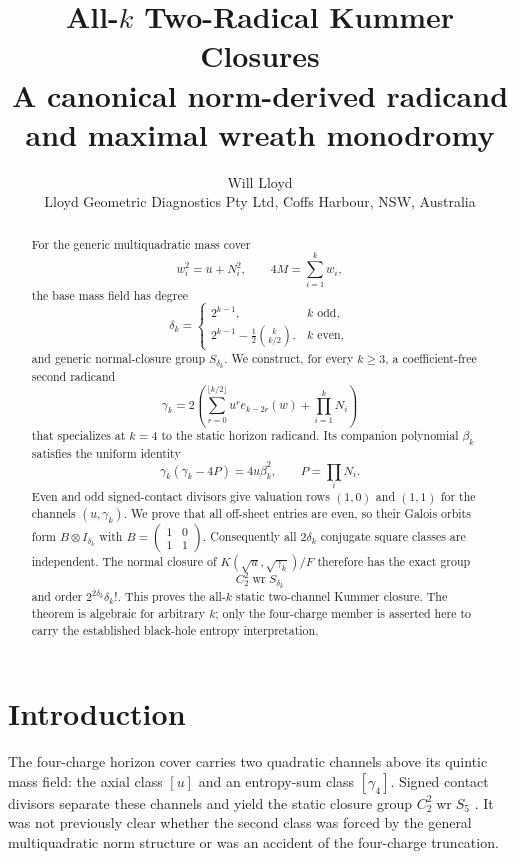 \documentclass[11pt,a4paper]{article}
\title{\textbf{All-$k$ Two-Radical Kummer Closures}\\[4pt]
\large A canonical norm-derived radicand and maximal wreath monodromy\\[6pt]
\normalsize\fbox{Completed proof --- v1.0 --- 18 July 2026}}
\author{Will Lloyd\\
\small Lloyd Geometric Diagnostics Pty Ltd, Coffs Harbour, NSW, Australia}
\date{}
\theoremstyle{definition}
\theoremstyle{remark}
\newcommand{\wrp}{\mathop{\mathrm{wr}}}
\begin{document}
\maketitle

\begin{abstract}
For the generic multiquadratic mass cover
\[
  w_i^2=u+N_i^2,\qquad 4M=\sum_{i=1}^k w_i,
\]
the base mass field has degree
\[
\delta_k=
\begin{cases}
2^{k-1},&k\text{ odd},\\
2^{k-1}-\frac12\binom{k}{k/2},&k\text{ even},
\end{cases}
\]
and generic normal-closure group $S_{\delta_k}$.  We construct, for every
$k\geq3$, a coefficient-free second radicand
\[
 \gamma_k=2\left(
 \sum_{r=0}^{\lfloor k/2\rfloor}u^r e_{k-2r}(w)
 +\prod_{i=1}^kN_i\right)
\]
that specializes at $k=4$ to the static horizon radicand.  Its companion
polynomial $\beta_k$ satisfies the uniform identity
\[
 \gamma_k(\gamma_k-4P)=4u\beta_k^2,
 \qquad P=\prod_iN_i.
\]
Even and odd signed-contact divisors give valuation rows $(1,0)$ and
$(1,1)$ for the channels $(u,\gamma_k)$.  We prove that all off-sheet
entries are even, so their Galois orbits form
$B\otimes I_{\delta_k}$ with
$B=\left(\begin{smallmatrix}1&0\\1&1\end{smallmatrix}\right)$.
Consequently all $2\delta_k$ conjugate square classes are independent.
The normal closure of
$K(\sqrt u,\sqrt{\gamma_k})/F$ therefore has the exact group
\[
 C_2^2\wrp S_{\delta_k}
\]
and order $2^{2\delta_k}\delta_k!$.  This proves the all-$k$ static
two-channel Kummer closure.  The theorem is algebraic for arbitrary $k$;
only the four-charge member is asserted here to carry the established
black-hole entropy interpretation.
\end{abstract}

\section{Introduction}

The four-charge horizon cover carries two quadratic channels above its
quintic mass field: the axial class $[u]$ and an entropy-sum class
$[\gamma_4]$.  Signed contact divisors separate these channels and yield the
static closure group $C_2^2\wrp S_5$ \cite{HorizonCover,KummerLift}.  It was
not previously clear whether the second class was forced by the general
multiquadratic norm structure or was an accident of the four-charge
truncation.
\end{document}
